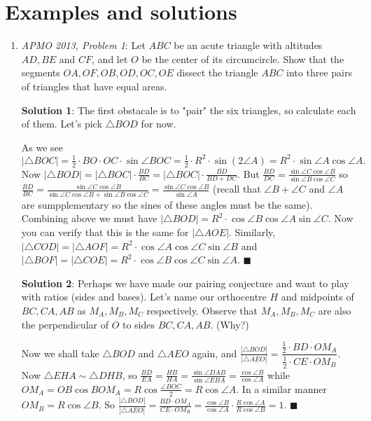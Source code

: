 \documentclass[11pt,a4paper]{article}
\begin{document}
\section{Examples and solutions}
\begin{enumerate}

\item \emph {APMO 2013, Problem 1}: Let $ABC$ be an acute triangle with altitudes $AD, BE$ and $CF$, and let $O$ be the center of its circumcircle.  Show that the segments $OA, OF, OB, OD, OC, OE$ dissect the triangle $ABC$ into three pairs of triangles that have equal areas.

\textbf {Solution 1}: The first obstacale is to "pair" the six triangles, so calculate each of them. Let's pick $\triangle BOD$ for now.

As we see $|\triangle BOC|=\frac{1}{2}\cdot BO\cdot OC\cdot\sin\angle BOC=\frac{1}{2}\cdot R^{2}\cdot\sin(2\angle A)=R^{2}\cdot\sin\angle A\cos\angle A.$ Now $|\triangle BOD|=|\triangle BOC|\cdot\frac{BD}{BC}=|\triangle BOC|\cdot\frac{BD}{BD+DC}.$ But $\frac{BD}{DC}=\frac{\sin\angle C\cos\angle B}{\sin\angle B\cos\angle C}$ so $\frac{BD}{BC}=\frac{\sin\angle C\cos\angle B}{\sin\angle C\cos\angle B+\sin\angle B\cos\angle C}=\frac{\sin\angle C\cos\angle B}{\sin\angle A}$ (recall that $\angle B+\angle C$ and $\angle A$ are sumpplementary so the sines of these angles must be the same). Combining above we must have $|\triangle BOD|=R^{2}\cdot\cos\angle B\cos\angle A\sin\angle C$. Now you can verify that this is the same for $|\triangle AOE|$. Similarly, $|\triangle COD|=|\triangle AOF|=R^{2}\cdot\cos \angle A\cos\angle C\sin\angle B$ and $|\triangle BOF|=|\triangle COE|=R^{2}\cdot\cos\angle B\cos\angle C\sin\angle A$. $\blacksquare$


\textbf {Solution 2}: Perhaps we have made our pairing conjecture and want to play with ratios (sides and bases). Let's name our orthocentre $H$ and midpoints of $BC, CA, AB$ as $M_A, M_B, M_C$ respectively. Observe that $M_A, M_B, M_C$ are also the perpendicular of $O$ to sides $BC, CA, AB$. (Why?)

Now we shall take $\triangle BOD$ and $\triangle AEO$ again, and $\frac{|\triangle BOD|}{|\triangle AEO|}=\dfrac{\frac{1}{2}\cdot BD\cdot OM_A}{\frac{1}{2}\cdot CE\cdot OM_B}$. Now $\triangle EHA\sim\triangle DHB$, so $\frac{BD}{EA}=\frac{HB}{HA}=\frac{\sin\angle DAB}{\sin\angle EBA}=\frac{\cos\angle B}{\cos\angle A}$ while $OM_A=OB\cos BOM_A=R\cos \frac{\angle BOC}{2}=R\cos\angle A$. In a similar manner $OM_B=R\cos\angle B$. So $\frac{|\triangle BOD|}{|\triangle AEO|}=\frac{BD\cdot OM_A}{CE\cdot OM_B}=\frac{\cos\angle B}{\cos\angle A}\cdot\frac{R\cos\angle A}{R\cos\angle B}=1.$ $\blacksquare$


\end{enumerate}
\end{document}
